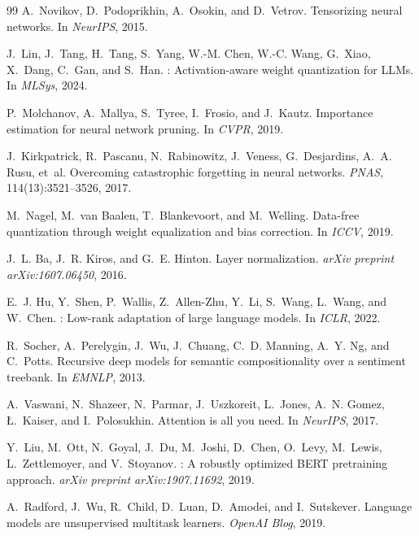 \begin{thebibliography}{99}
A.~Novikov, D.~Podoprikhin, A.~Osokin, and D.~Vetrov.
\newblock Tensorizing neural networks.
\newblock In \emph{NeurIPS}, 2015.

J.~Lin, J.~Tang, H.~Tang, S.~Yang, W.-M. Chen, W.-C. Wang, G.~Xiao, X.~Dang, C.~Gan, and S.~Han.
: Activation-aware weight quantization for {LLM}s.
\newblock In \emph{MLSys}, 2024.

P.~Molchanov, A.~Mallya, S.~Tyree, I.~Frosio, and J.~Kautz.
\newblock Importance estimation for neural network pruning.
\newblock In \emph{CVPR}, 2019.

J.~Kirkpatrick, R.~Pascanu, N.~Rabinowitz, J.~Veness, G.~Desjardins, A.~A. Rusu, et~al.
\newblock Overcoming catastrophic forgetting in neural networks.
\newblock \emph{PNAS}, 114(13):3521--3526, 2017.

M.~Nagel, M.~van Baalen, T.~Blankevoort, and M.~Welling.
\newblock Data-free quantization through weight equalization and bias correction.
\newblock In \emph{ICCV}, 2019.

J.~L. Ba, J.~R. Kiros, and G.~E. Hinton.
\newblock Layer normalization.
\newblock \emph{arXiv preprint arXiv:1607.06450}, 2016.

E.~J. Hu, Y.~Shen, P.~Wallis, Z.~Allen-Zhu, Y.~Li, S.~Wang, L.~Wang, and W.~Chen.
: Low-rank adaptation of large language models.
\newblock In \emph{ICLR}, 2022.

R.~Socher, A.~Perelygin, J.~Wu, J.~Chuang, C.~D. Manning, A.~Y. Ng, and C.~Potts.
\newblock Recursive deep models for semantic compositionality over a sentiment treebank.
\newblock In \emph{EMNLP}, 2013.

A.~Vaswani, N.~Shazeer, N.~Parmar, J.~Uszkoreit, L.~Jones, A.~N. Gomez, {\L}.~Kaiser, and I.~Polosukhin.
\newblock Attention is all you need.
\newblock In \emph{NeurIPS}, 2017.

Y.~Liu, M.~Ott, N.~Goyal, J.~Du, M.~Joshi, D.~Chen, O.~Levy, M.~Lewis, L.~Zettlemoyer, and V.~Stoyanov.
: A robustly optimized {BERT} pretraining approach.
\newblock \emph{arXiv preprint arXiv:1907.11692}, 2019.

A.~Radford, J.~Wu, R.~Child, D.~Luan, D.~Amodei, and I.~Sutskever.
\newblock Language models are unsupervised multitask learners.
\newblock \emph{OpenAI Blog}, 2019.


\end{thebibliography}
